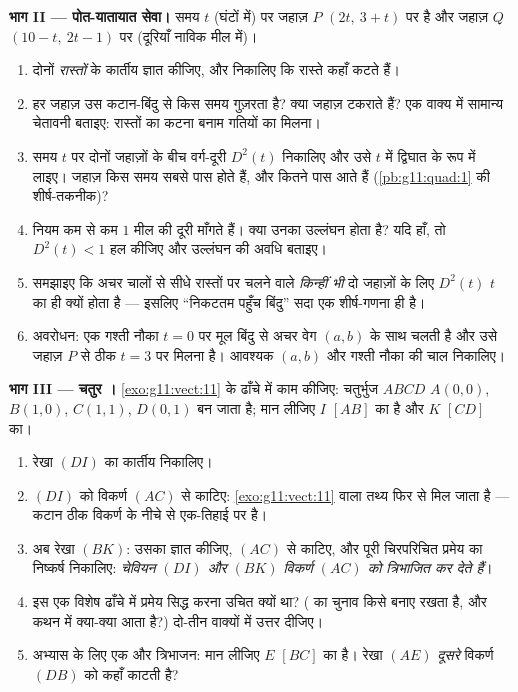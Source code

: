 \begin{problem}
\medskip
\noindent\textbf{भाग II --- पोत-यातायात सेवा।}
समय $t$ (घंटों में) पर जहाज़ $P$ $(2t,\ 3 + t)$ पर है और जहाज़ $Q$ $(10 - t,\ 2t - 1)$ पर
(दूरियाँ नाविक मील में)।
\begin{enumerate}[resume]
  \item दोनों \emph{रास्तों} के कार्तीय  ज्ञात कीजिए, और निकालिए कि
        रास्ते कहाँ कटते हैं।
  \item हर जहाज़ उस कटान-बिंदु से किस समय गुज़रता है? क्या जहाज़ टकराते हैं?
        एक वाक्य में सामान्य चेतावनी बताइए: रास्तों का कटना बनाम गतियों का
        मिलना।
  \item समय $t$ पर दोनों जहाज़ों के बीच वर्ग-दूरी $D^2(t)$ निकालिए और उसे
        $t$ में द्विघात के रूप में लाइए। जहाज़ किस समय सबसे पास होते हैं,
        और कितने पास आते हैं (\cref{pb:g11:quad:1} की शीर्ष-तकनीक)?
  \item नियम कम से कम $1$ मील की दूरी माँगते हैं। क्या उनका उल्लंघन होता
        है? यदि हाँ, तो $D^2(t) < 1$ हल कीजिए और उल्लंघन की अवधि बताइए।
  \item समझाइए कि अचर चालों से सीधे रास्तों पर चलने वाले \emph{किन्हीं भी}
        दो जहाज़ों के लिए $D^2(t)$ $t$ का  ही क्यों होता है ---
        इसलिए ``निकटतम पहुँच बिंदु'' सदा एक शीर्ष-गणना ही है।
  \item अवरोधन: एक गश्ती नौका $t = 0$ पर मूल बिंदु से अचर वेग $(a, b)$ के साथ
        चलती है और उसे जहाज़ $P$ से ठीक $t = 3$ पर मिलना है। आवश्यक $(a, b)$
        और गश्ती नौका की चाल निकालिए।
\end{enumerate}

\medskip
\noindent\textbf{भाग III --- चतुर ।}
\cref{exo:g11:vect:11} के ढाँचे में काम कीजिए:  चतुर्भुज $ABCD$ $A(0,0)$, $B(1,0)$, $C(1,1)$,
$D(0,1)$ बन जाता है; मान लीजिए $I$ $[AB]$ का  है और $K$ $[CD]$ का।
\begin{enumerate}[resume]
  \item रेखा $(DI)$ का कार्तीय  निकालिए।
  \item $(DI)$ को विकर्ण $(AC)$ से काटिए: \cref{exo:g11:vect:11} वाला तथ्य फिर से मिल जाता है
        --- कटान ठीक विकर्ण के नीचे से एक-तिहाई पर है।
  \item अब रेखा $(BK)$: उसका  ज्ञात कीजिए, $(AC)$ से काटिए, और पूरी
        चिरपरिचित प्रमेय का निष्कर्ष निकालिए: \emph{चेवियन $(DI)$ और $(BK)$
        विकर्ण $(AC)$ को त्रिभाजित कर देते हैं}।
  \item इस एक विशेष ढाँचे में प्रमेय सिद्ध करना उचित क्यों था? (
        का चुनाव किसे बनाए रखता है, और कथन में क्या-क्या आता है?) दो-तीन
        वाक्यों में उत्तर दीजिए।
  \item अभ्यास के लिए एक और त्रिभाजन: मान लीजिए $E$ $[BC]$ का 
        है। रेखा $(AE)$ \emph{दूसरे} विकर्ण $(DB)$ को कहाँ काटती है?
\end{enumerate}


\end{problem}
